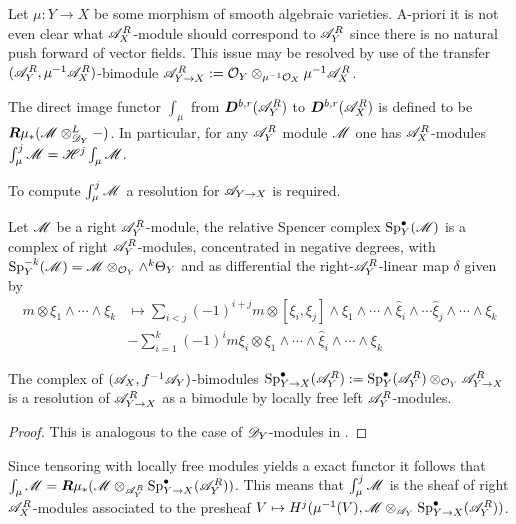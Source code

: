     Let $\mu:Y\to X$ be some morphism of smooth algebraic varieties.  A-priori it is not even clear what $\mathscr{A}_X^R$-module should correspond to $\mathscr{A}_Y^R$ since there is no natural push forward of vector fields. This issue may be resolved by use of the transfer $(\mathscr{A}_Y^R,\mu^{-1}\mathscr{A}_X^R)$-bimodule $\mathscr{A}_{Y\to X}^R:= \mathcal{O}_Y \otimes_{\mu^{-1}\mathcal{O}_X}\mu^{-1}\mathscr{A}_X^R$.

    \begin{definition}
      The direct image functor $\int_\mu$ from $\boldsymbol{D}^{b,r}(\mathscr{A}_Y^R)$ to $\boldsymbol{D}^{b,r}(\mathscr{A}_X^R)$ is defined to be $\boldsymbol{R}\mu_* (\mathscr{M} \otimes_{\mathscr{D}_Y}^L {-})$. In particular, for any $\mathscr{A}_Y^R$ module $\mathscr{M}$ one has $\mathscr{A}_X^R$-modules $\int_\mu^j \mathscr{M} = \mathscr{H}^j \int_\mu \mathscr{M}$.
    \end{definition}

    To compute $\int_\mu^j \mathscr{M}$ a resolution for $\mathscr{A}_{Y\to X}$ is required.
    \begin{definition}
        Let $\mathscr{M}$ be a right $\mathscr{A}_Y^R$-module, the relative Spencer complex $\operatorname{Sp}_Y^\bullet(\mathscr{M})$ is a complex of right $\mathscr{A}_Y^R$-modules, concentrated in negative degrees, with $\operatorname{Sp}_Y^{-k}(\mathscr{M}) = \mathscr{M} \otimes_{\mathcal{O}_Y} \wedge^{k}\Theta_Y$ and as differential the right-$\mathscr{A}_Y^R$-linear map $\delta$ given by
        \begin{align*}
            m\otimes \xi_1 \wedge \cdots \wedge \xi_k &\mapsto \sum_{i<j}(-1)^{i+j} m \otimes [\xi_i,\xi_j]\wedge \xi_1 \wedge \cdots \wedge \widehat{\xi}_i \wedge\cdots \widehat{\xi}_j \wedge \cdots \wedge \xi_k\\
            &- \sum_{i=1}^k (-1)^{i} m\xi_i \otimes \xi_1 \wedge \cdots \wedge \widehat{\xi}_i\wedge \cdots \wedge \xi_k
        \end{align*}
    \end{definition}
        \begin{lemma}
            The complex of $(\mathscr{A}_X,f^{-1}\mathscr{A}_Y)$-bimodules $\operatorname{Sp}^\bullet_{Y\to X}(\mathscr{A}_Y^R) := \operatorname{Sp}^\bullet_Y(\mathscr{A}_Y^R) \otimes_{\mathcal{O}_Y}\mathscr{A}_{Y \to X}^R$ is a resolution of $\mathscr{A}_{Y\to X}^R$ as a bimodule by locally free left $\mathscr{A}_Y^R$-modules.
        \end{lemma}
        \begin{proof}
            This is analogous to the case of $\mathscr{D}_Y$-modules in \cite[p33]{sabbah2011introduction}.
        \end{proof}
        Since tensoring with locally free modules yields a exact functor it follows that $\int_\mu\mathscr{M} = \boldsymbol{R}\mu_* (\mathscr{M} \otimes_{\mathscr{A}_Y^R} \operatorname{Sp}_{Y\to X}^\bullet(\mathscr{A}_Y^R))$. This means that $\int_\mu^j \mathscr{M}$ is the sheaf of right $\mathscr{A}_X^R$-modules associated to the presheaf $V \mapsto H^j(\mu^{-1}(V), \mathscr{M} \otimes_{\mathscr{A}_Y} \operatorname{Sp}_{Y\to X}^\bullet(\mathscr{A}_Y^R))$.
